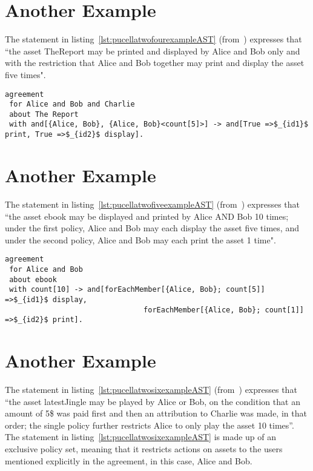 \section {Another Example}
The statement in listing~\ref{lst:pucellatwofourexampleAST} (from~\cite{pucella2006}) expresses that ``the asset TheReport may be printed and displayed by Alice and Bob only and with the restriction that Alice and Bob together may print and display the asset five times".

\lstset{language=Pucella2006}
\begin{minipage}[c]{0.95\textwidth}
\begin{lstlisting}[frame=single, caption={Agreement of Example 2.4}, label={lst:pucellatwofourexampleAST}, mathescape]
agreement
 for Alice and Bob and Charlie
 about The Report 
 with and[{Alice, Bob}, {Alice, Bob}<count[5]>] -> and[True =>$_{id1}$ print, True =>$_{id2}$ display].
\end{lstlisting}
\end{minipage} 
%

\section {Another Example}
The statement in listing~\ref{lst:pucellatwofiveexampleAST} (from~\cite{pucella2006}) expresses that ``the asset ebook may be displayed and printed by Alice AND Bob 10 times; under the first policy, Alice and Bob may each display the asset five times, and under the second policy, Alice and Bob may each print the asset 1 time".


\lstset{language=Pucella2006}
\begin{minipage}[c]{0.95\textwidth}
\begin{lstlisting}[frame=single, caption={Agreement of Example 2.5}, label={lst:pucellatwofiveexampleAST}, mathescape]
agreement
 for Alice and Bob 
 about ebook 
 with count[10] -> and[forEachMember[{Alice, Bob}; count[5]] =>$_{id1}$ display, 
                                forEachMember[{Alice, Bob}; count[1]] =>$_{id2}$ print].
\end{lstlisting}
\end{minipage} 
%

\section {Another Example}
The statement in listing~\ref{lst:pucellatwosixexampleAST} (from~\cite{pucella2006}) expresses that ``the asset latestJingle may be played by Alice or Bob, on the condition that an amount of 5\$ was paid first and then an attribution to Charlie was made, in that order; the single policy further restricts Alice to only play the asset 10 times''. The statement in listing~\ref{lst:pucellatwosixexampleAST} is made up of an exclusive policy set, meaning that it restricts actions on assets to the users mentioned explicitly in the agreement, in this case, Alice and Bob.

